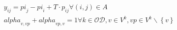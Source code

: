 \begin{align}
  & y_{i j} = \mathit{pi}_{j} - \mathit{pi}_{i} + T \cdot p_{i j} \forall \left(i , j\right) \in A \tag{eq\_0011} \\
  & \mathit{alpha}_{v , vp} + \mathit{alpha}_{vp , v} = 1 \forall k \in \mathcal{OD} , v \in V^{k} , vp \in V^{k} \backslash \left\{v\right\} \tag{eq\_0015} \\
\end{align}
